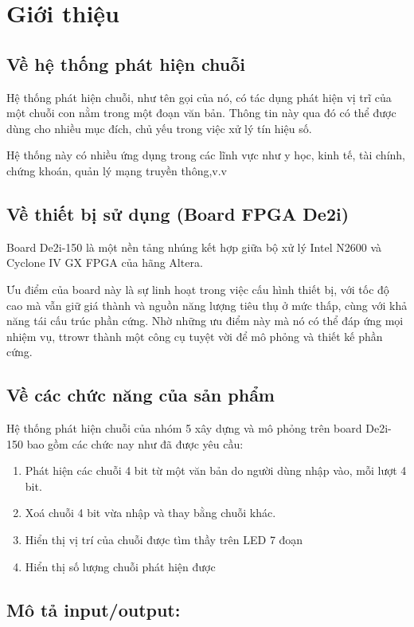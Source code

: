 \documentclass[a4paper]{article}
\begin{document}

\newpage
\tableofcontents
\newpage


\section{Giới thiệu}
\subsection{Về hệ thống phát hiện chuỗi}
Hệ thống phát hiện chuỗi, như tên gọi của nó, có tác dụng phát hiện vị trĩ của một chuỗi con nằm trong  một đoạn văn bản. Thông tin này qua đó có thể được dùng cho nhiều mục đích, chủ yếu trong việc xử lý tín hiệu số.

Hệ thống này có nhiều ứng dụng trong các lĩnh vực như y học, kinh tế, tài chính, chứng khoán, quản lý mạng truyền thông,v.v

\subsection{Về thiết bị sử dụng (Board FPGA De2i)}
Board De2i-150 là một nền tảng nhúng kết hợp giữa bộ xử lý Intel N2600 và Cyclone IV GX FPGA của hãng Altera.

Ưu điểm của board này là sự linh hoạt trong việc cấu hình thiết bị, với tốc độ cao mà vẫn giữ giá thành và nguồn năng lượng tiêu thụ ở mức thấp, cùng với khả năng tái cấu trúc phần cứng. Nhờ những ưu điểm này mà nó có thể đáp ứng mọi nhiệm vụ,  ttrowr thành một công cụ tuyệt vời để mô phỏng và thiết kế phần cứng.
\subsection{Về các chức năng của sản phẩm}
Hệ thống phát hiện chuỗi của nhóm 5 xây dựng và mô phỏng trên board De2i-150 bao gồm các chức nay như đã được yêu cầu:
\begin{enumerate}
	\item Phát hiện các chuỗi 4 bit từ một văn bản do người dùng nhập vào, mỗi lượt 4 bit.
	\item Xoá chuỗi 4 bit vừa nhập và thay bằng chuỗi khác.
	\item Hiển thị vị trí của chuỗi được tìm thầy trên LED 7 đoạn
	\item Hiển thị số lượng chuỗi phát hiện được
\end{enumerate}

\subsection{Mô tả input/output:}
\end{document}
